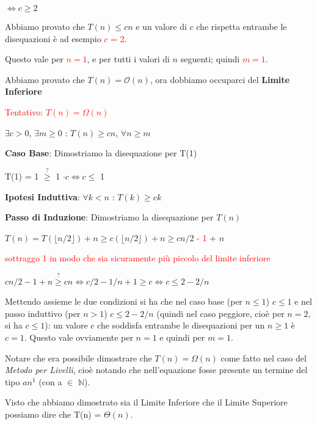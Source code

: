\documentclass[../cheatSheetAlgoritmi.tex]{subfiles}
\begin{document}
$\iff c \geq 2$

Abbiamo provato che $T(n) \leq cn$ e un valore di $c$ che rispetta entrambe le disequazioni è ad esempio \textcolor{red}{$c$ = 2}.

Questo vale per \textcolor{red}{$n = 1$}, e per tutti i valori di $n$ seguenti; quindi \textcolor{red}{$m = 1$}.

Abbiamo provato che $T(n) = \mathcal{O}(n)$, ora dobbiamo occuparci del \textbf{Limite Inferiore}

\bigskip

\textcolor{red}{Tentativo: $T(n) = \Omega(n)$}

$\exists c > 0$, $\exists m \geq 0$ : $T(n) \geq cn$, $\forall n \geq m$

\bigskip

\textbf{Caso Base}: Dimostriamo la disequazione per T(1)

T(1) = 1 $\stackrel{?}{\geq}$ 1 $\cdot c \iff c \leq$ 1

\bigskip

\textbf{Ipotesi Induttiva}: $\forall k < n$ : $T(k) \geq ck$

\textbf{Passo di Induzione}: Dimostriamo la disequazione per $T(n)$

$T(n) =  T(\lfloor n/2 \rfloor) + n \geq c( \lfloor n/2 \rfloor) + n \geq cn/2$ \textcolor{red}{- 1} + $n$

\bigskip

\textcolor{red}{sottraggo 1 in modo che sia sicuramente più piccolo del limite inferiore} 

\bigskip

$cn/2 - 1 + n \stackrel{?}{\geq} cn \iff c/2 - 1/n + 1 \geq c \iff c \leq 2 - 2/n$

\begin{flushleft}
Mettendo assieme le due condizioni si ha che nel caso base (per $n \leq 1$) $c \leq 1$ e nel passo induttivo (per $n > 1$) $c \leq 2 - 2/n$ (quindi nel caso peggiore, cioè per $n = 2$, si ha $c \leq 1$): un valore $c$ che soddisfa entrambe le disequazioni per un $n \geq 1$ è $c = 1$. Questo vale ovviamente per $n = 1$ e quindi per $m = 1$.
\end{flushleft}
Notare che era possibile dimostrare che $T(n) = \Omega(n)$ come fatto nel caso del \emph{Metodo per Livelli}, cioè notando che nell'equazione fosse presente un termine del tipo  $an^{1}$ (con a $\in$ $\mathbb{N}$).

Visto che abbiamo dimostrato sia il Limite Inferiore che il Limite Superiore possiamo dire che T(n) = $\Theta(n)$.
\end{document}
